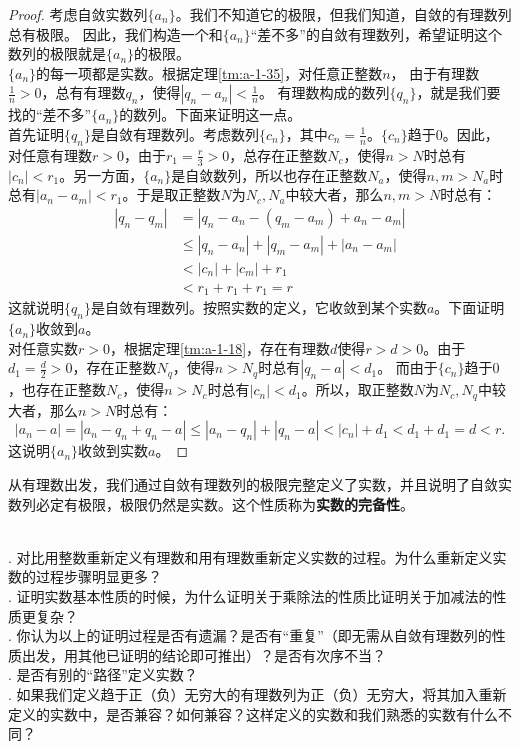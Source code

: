 \documentclass[12pt,UTF8]{ctexbook}
\begin{document}
\begin{appendix}
\begin{proof}
    考虑自敛实数列$\{a_n\}$。我们不知道它的极限，但我们知道，自敛的有理数列总有极限。
    因此，我们构造一个和$\{a_n\}$“差不多”的自敛有理数列，希望证明这个数列的极限就是$\{a_n\}$的极限。\\
    $\{a_n\}$的每一项都是实数。根据定理\ref{tm:a-1-35}，对任意正整数$n$，
    由于有理数$\frac{1}{n}>0$，总有有理数$q_n$，使得$|q_n - a_n| < \frac{1}{n}$。
    有理数构成的数列$\{q_n\}$，就是我们要找的“差不多”$\{a_n\}$的数列。下面来证明这一点。\\
    首先证明$\{q_n\}$是自敛有理数列。考虑数列$\{c_n\}$，其中$c_n = \frac{1}{n}$。$\{c_n\}$趋于$0$。因此，对任意有理数$r>0$，由于$r_1 = \frac{r}{3} > 0$，总存在正整数$N_c$，使得$n>N$时总有$|c_n| < r_1$。另一方面，$\{a_n\}$是自敛数列，所以也存在正整数$N_a$，使得$n,m>N_a$时总有$|a_n - a_m| < r_1$。于是取正整数$N$为$N_c,N_a$中较大者，那么$n,m>N$时总有：
    \begin{align*}
        |q_n - q_m| &= |q_n - a_n - (q_m - a_m) + a_n -a_m|  \\
        &\leqslant |q_n - a_n| + |q_m - a_m| + |a_n - a_m|  \\
        &< |c_n| + |c_m| + r_1  \\
        &< r_1 + r_1 + r_1 = r 
    \end{align*}
    这就说明$\{q_n\}$是自敛有理数列。按照实数的定义，它收敛到某个实数$a$。下面证明$\{a_n\}$收敛到$a$。\\
    对任意实数$r>0$，根据定理\ref{tm:a-1-18}，存在有理数$d$使得$r>d>0$。由于$d_1 = \frac{d}{2}>0$，存在正整数$N_q$，使得$n>N_q$时总有$|q_n - a| < d_1$。
    而由于$\{c_n\}$趋于$0$，也存在正整数$N_c$，使得$n>N_c$时总有$|c_n| < d_1$。所以，取正整数$N$为$N_c,N_q$中较大者，那么$n>N$时总有：
    $$ |a_n - a| = |a_n - q_n + q_n - a| \leqslant |a_n - q_n| + |q_n - a| < |c_n| + d_1 < d_1 + d_1 = d < r.$$
    这说明$\{a_n\}$收敛到实数$a$。
\end{proof}

从有理数出发，我们通过自敛有理数列的极限完整定义了实数，并且说明了自敛实数列必定有极限，极限仍然是实数。这个性质称为\textbf{实数的完备性}。

\begin{sk}
    \mbox{} \\
    . 对比用整数重新定义有理数和用有理数重新定义实数的过程。为什么重新定义实数的过程步骤明显更多？\\
    . 证明实数基本性质的时候，为什么证明关于乘除法的性质比证明关于加减法的性质更复杂？\\
    . 你认为以上的证明过程是否有遗漏？是否有“重复”（即无需从自敛有理数列的性质出发，用其他已证明的结论即可推出）？是否有次序不当？\\
    . 是否有别的“路径”定义实数？\\
    . 如果我们定义趋于正（负）无穷大的有理数列为正（负）无穷大，将其加入重新定义的实数中，是否兼容？如何兼容？这样定义的实数和我们熟悉的实数有什么不同？
\end{sk} 


\end{appendix}
\end{document}
